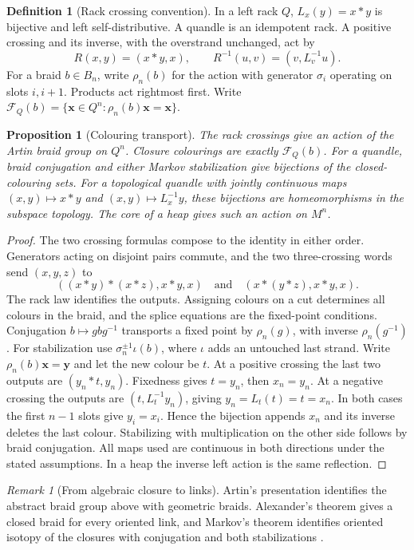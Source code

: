 \documentclass[11pt,reqno]{amsart}
\newtheorem{proposition}[theorem]{Proposition}
\theoremstyle{definition}
\newtheorem{definition}[theorem]{Definition}
\theoremstyle{remark}
\newtheorem{remark}[theorem]{Remark}
\numberwithin{equation}{section}
\begin{document}
\begin{definition}[Rack crossing convention]\label{m7:braid-def}
In a left rack $Q$, $L_x(y)=x*y$ is bijective and left self-distributive.
A quandle is an idempotent rack. A positive crossing and its inverse,
with the overstrand unchanged, act by
\[
R(x,y)=(x*y,x),\qquad R^{-1}(u,v)=(v,L_v^{-1}u).
\]
For a braid $b\in B_n$, write $\rho_n(b)$ for the action with generator
$\sigma_i$ operating on slots $i,i+1$. Products act rightmost first. Write
$\mathcal F_Q(b)=\{\mathbf x\in Q^n:\rho_n(b)\mathbf x=\mathbf x\}$.
\end{definition}

\begin{proposition}[Colouring transport]\label{m7:braids}
The rack crossings give an action of the Artin braid group on $Q^n$.
Closure colourings are exactly $\mathcal F_Q(b)$.
For a quandle, braid conjugation and either Markov stabilization give
bijections of the closed-colouring sets. For a topological quandle with
jointly continuous maps $(x,y)\mapsto x*y$ and $(x,y)\mapsto L_x^{-1}y$,
these bijections are homeomorphisms in
the subspace topology. The core of a heap gives such an action on $M^n$.
\end{proposition}
\begin{proof}
The two crossing formulas compose to the identity in either order.
Generators acting on disjoint pairs commute, and the two three-crossing
words send $(x,y,z)$ to
\[
((x*y)*(x*z),x*y,x)\quad\text{and}\quad(x*(y*z),x*y,x).
\]
The rack law identifies the outputs. Assigning colours on a cut determines
all colours in the braid, and the splice equations are the fixed-point
conditions. Conjugation $b\mapsto gbg^{-1}$ transports a fixed point by
$\rho_n(g)$, with inverse $\rho_n(g^{-1})$. For stabilization use
$\sigma_n^{\pm1}\iota(b)$, where $\iota$ adds an untouched last strand.
Write $\rho_n(b)\mathbf x=\mathbf y$ and let the new colour be $t$.
At a positive crossing the last two outputs are $(y_n*t,y_n)$.
Fixedness gives $t=y_n$, then $x_n=y_n$. At a negative crossing the outputs
are $(t,L_t^{-1}y_n)$, giving $y_n=L_t(t)=t=x_n$. In both cases the first
$n-1$ slots give $y_i=x_i$. Hence the bijection appends $x_n$ and its
inverse deletes the last colour. Stabilizing with multiplication on the
other side follows by braid conjugation. All maps used are continuous
in both directions under the stated assumptions. In a heap the inverse
left action is the same reflection.
\end{proof}

\begin{remark}[From algebraic closure to links]\label{m7:link}
Artin's presentation identifies the abstract braid group above with
geometric braids. Alexander's theorem gives a closed braid for every
oriented link, and Markov's theorem identifies oriented isotopy of the
closures with conjugation and both stabilizations
\cite{m7:Artin,m7:Alexander,m7:Markov}\cite[Theorem~2.3]{m7:Birman}. 
\end{remark}
\end{document}
